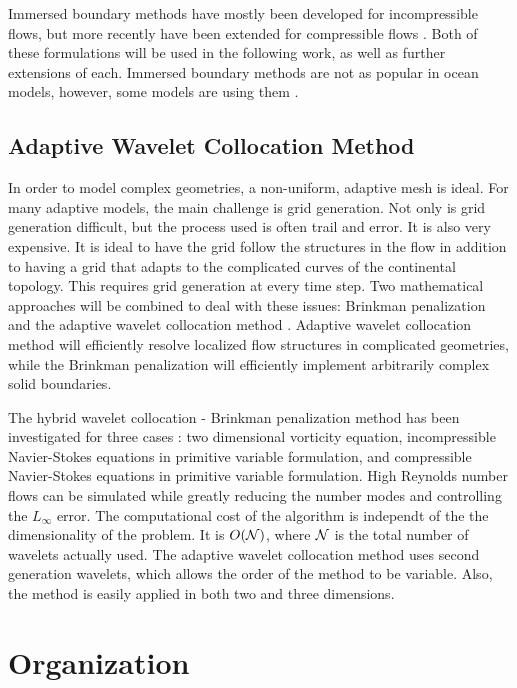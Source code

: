 Immersed boundary methods have mostly been developed for incompressible flows, but more recently have been extended for compressible flows \cite{06LV}.  Both of these formulations will be used in the following work, as well as further extensions of each.  Immersed boundary methods are not as popular in ocean models, however, some models are using them \cite{06FGS}.  

\subsection{Adaptive Wavelet Collocation Method}

In order to model complex geometries, a non-uniform, adaptive mesh is ideal.  For many adaptive models, the main challenge is grid generation.  Not only is grid generation difficult, but the process used is often trail and error.  It is also very expensive.  It is ideal to have the grid follow the structures in the flow in addition to having a grid that adapts to the complicated curves of the continental topology.  This requires grid generation at every time step.  Two mathematical approaches will be combined to deal with these issues:  Brinkman penalization \cite{84AC} and the adaptive wavelet collocation method \cite{00VB, 03Vasilyev, 02VK, 96VP, 97VP}.  Adaptive wavelet collocation method will efficiently resolve localized flow structures in complicated geometries, while the Brinkman penalization will efficiently implement arbitrarily complex solid boundaries.  

The hybrid wavelet collocation - Brinkman penalization method has been investigated for three cases \cite{05KV, 00KVC, 02VK, 06LV}:  two dimensional vorticity equation, incompressible Navier-Stokes equations in primitive variable formulation, and compressible Navier-Stokes equations in primitive variable formulation.  High Reynolds number flows can be simulated while greatly reducing the number modes and controlling the $L_{\infty}$ error.  The computational cost of the algorithm is independt of the the dimensionality of the problem.  It is $O({\cal N})$, where ${\cal N}$ is the total number of wavelets actually used.  The adaptive wavelet collocation method uses second generation wavelets, which allows the order of the method to be variable.  Also, the method is easily applied in both two and three dimensions.  

\section{Organization}

